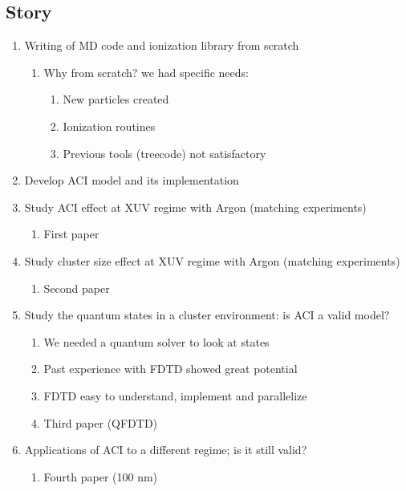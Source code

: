 \subsection{Story}
\begin{enumerate}
    \item Writing of MD code and ionization library from scratch
    \begin{enumerate}
        \item Why from scratch? we had specific needs:
        \begin{enumerate}
            \item New particles created
            \item Ionization routines
            \item Previous tools (treecode) not satisfactory
        \end{enumerate}
    \end{enumerate}
    \item Develop ACI model and its implementation
    \item Study ACI effect at XUV regime with Argon (matching experiments)
    \begin{enumerate}
        \item First paper
    \end{enumerate}
    \item Study cluster size effect at XUV regime with Argon (matching experiments)
    \begin{enumerate}
        \item Second paper
    \end{enumerate}
    \item Study the quantum states in a cluster environment: is ACI a valid model?
    \begin{enumerate}
        \item We needed a quantum solver to look at states
        \item Past experience with FDTD showed great potential
        \item FDTD easy to understand, implement and parallelize
        \item Third paper (QFDTD)
    \end{enumerate}
    \item Applications of ACI to a different regime; is it still valid?
    \begin{enumerate}
        \item Fourth paper (100 nm)
    \end{enumerate}
\end{enumerate}




